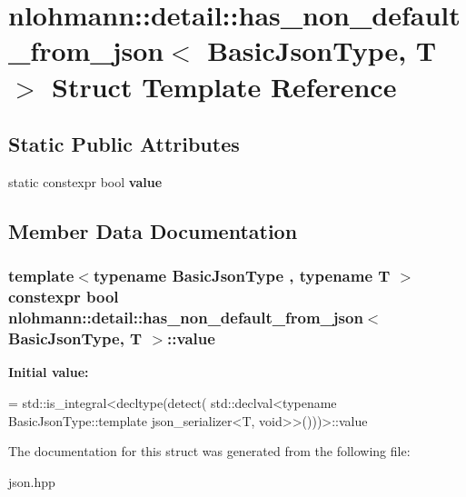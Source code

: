 \hypertarget{structnlohmann_1_1detail_1_1has__non__default__from__json}{}\section{nlohmann\+:\+:detail\+:\+:has\+\_\+non\+\_\+default\+\_\+from\+\_\+json$<$ Basic\+Json\+Type, T $>$ Struct Template Reference}
\label{structnlohmann_1_1detail_1_1has__non__default__from__json}
\subsection*{Static Public Attributes}
\begin{DoxyCompactItemize}
\item 
static constexpr bool {\bfseries value}
\end{DoxyCompactItemize}


\subsection{Member Data Documentation}
\subsubsection[{\texorpdfstring{value}{value}}]{\setlength{\rightskip}{0pt plus 5cm}template$<$typename Basic\+Json\+Type , typename T $>$ constexpr bool {\bf nlohmann\+::detail\+::has\+\_\+non\+\_\+default\+\_\+from\+\_\+json}$<$ Basic\+Json\+Type, T $>$\+::value\hspace{0.3cm}{\ttfamily [static]}}\hypertarget{structnlohmann_1_1detail_1_1has__non__default__from__json_ad34bb7cd3961fcafc2c5047a9782e931}{}\label{structnlohmann_1_1detail_1_1has__non__default__from__json_ad34bb7cd3961fcafc2c5047a9782e931}
{\bfseries Initial value\+:}
\begin{DoxyCode}
= std::is\_integral<decltype(detect(
                                      std::declval<\textcolor{keyword}{typename} BasicJsonType::template json\_serializer<T,
       void>>()))>::value
\end{DoxyCode}


The documentation for this struct was generated from the following file\+:\begin{DoxyCompactItemize}
\item 
json.\+hpp\end{DoxyCompactItemize}

